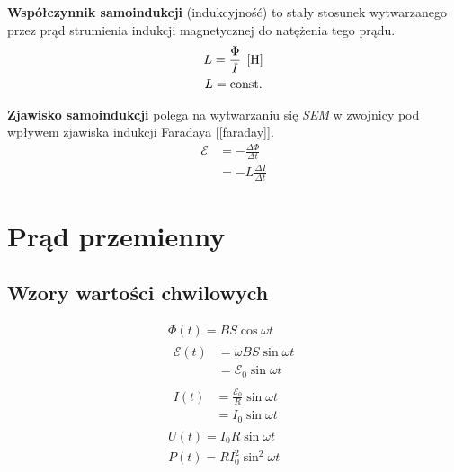 \newpage %
\begin{definition}
  \textbf{Współczynnik samoindukcji} (indukcyjność) to stały stosunek wytwarzanego przez prąd
  strumienia indukcji magnetycznej do natężenia tego prądu.
  \begin{gather*}
    L = \frac \Phi I \;\left[\mathrm{H}\right]\\
    L = \operatorname{const.}
  \end{gather*}
\end{definition}

\begin{definition}
  \textbf{Zjawisko samoindukcji} polega na wytwarzaniu się \textit{SEM} w zwojnicy pod wpływem
  zjawiska indukcji Faradaya [\ref{faraday}].
  \begin{equation}
    \begin{aligned}
      \mathcal E &= -\frac{\Delta \Phi}{\Delta t}\\
      &= -L\frac{\Delta I}{\Delta t}
    \end{aligned}
  \end{equation}
\end{definition}

\section{Prąd przemienny}

\subsection{Wzory wartości chwilowych}
\begin{subequations}
  \begin{gather}
    \Phi(t) = BS \cos \omega t\\[10pt]
    \begin{aligned}
      \mathcal E(t) &= \omega BS \sin \omega t\\
      &= \mathcal E_0\sin\omega t
    \end{aligned}\\[10pt]
    \begin{aligned}
      I(t) &= \frac{\mathcal E_0}{R}\sin\omega t\\
      &= I_0\sin \omega t
    \end{aligned}\\[10pt]
    U(t) = I_0 R \sin \omega t\\[10pt]
    P(t) = R I_0^2\sin^2 \omega t
  \end{gather}
\end{subequations}

